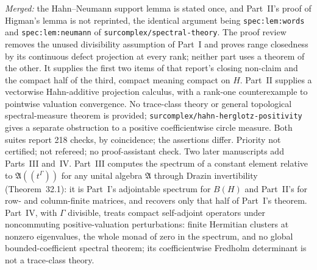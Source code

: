 \documentclass[11pt]{article}
\begin{document}
{\emph{Merged:} the Hahn--Neumann support lemma is stated once, and Part~II's
proof of Higman's lemma is not reprinted, the identical argument being
\texttt{spec:lem:words} and \texttt{spec:lem:neumann} of
\nolinkurl{surcomplex/spectral-theory}. The proof review removes the
unused divisibility assumption of Part~I and proves range closedness by its
continuous defect projection at every rank; neither part uses a theorem of
the other.  It supplies the first two items of
that report's closing non-claim and the compact half of the third, compact
meaning compact on $H$. Part~II supplies a vectorwise Hahn-additive
projection calculus, with a rank-one counterexample to pointwise valuation
convergence. No trace-class theory or general topological spectral-measure
theorem is provided; \nolinkurl{surcomplex/hahn-herglotz-positivity} gives a
separate obstruction to a positive coefficientwise circle measure.  Both suites report 218 checks, by coincidence; the
assertions differ.  Priority not certified; not refereed; no proof-assistant
check.  Two later manuscripts add Parts~III and~IV.  Part~III computes the
spectrum of a constant element relative to $\mathfrak{A}((t^\Gamma))$ for any
unital algebra $\mathfrak{A}$ through Drazin invertibility (Theorem~32.1): it is
Part~I's adjointable spectrum for $B(H)$ and Part~II's for row- and
column-finite matrices, and recovers only that half of Part~I's theorem.
Part~IV, with $\Gamma$ divisible, treats compact self-adjoint operators under
noncommuting positive-valuation perturbations: finite Hermitian clusters at
nonzero eigenvalues, the whole monad of zero in the spectrum, and no global
bounded-coefficient spectral theorem; its coefficientwise Fredholm
determinant is not a trace-class theory.}
\end{document}
